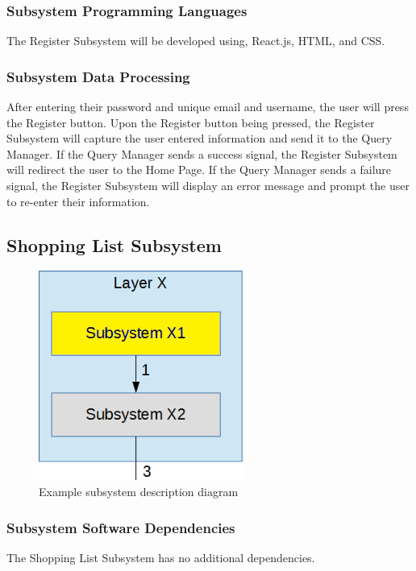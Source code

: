 \subsubsection{Subsystem Programming Languages}
The Register Subsystem will be developed using, React.js, HTML, and CSS.

\subsubsection{Subsystem Data Processing}
After entering their password and unique email and username, the user will press the Register button. Upon the Register button being pressed, the Register Subsystem will capture the user entered information and send it to the Query Manager. If the Query Manager sends a success signal, the Register Subsystem will redirect the user to the Home Page. If the Query Manager sends a failure signal, the Register Subsystem will display an error message and prompt the user to re-enter their information.

\subsection{Shopping List Subsystem}

\begin{figure}[h!]
	\centering
 	\includegraphics[width=0.60\textwidth]{images/subsystem}
 \caption{Example subsystem description diagram}
\end{figure}

\subsubsection{Subsystem Software Dependencies}
The Shopping List Subsystem has no additional dependencies.

